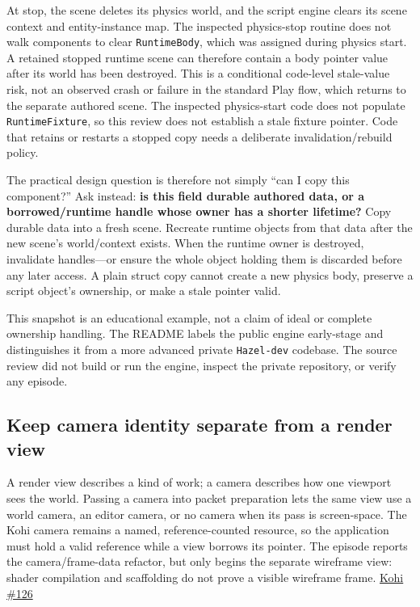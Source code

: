 At stop, the scene deletes its physics world, and the script engine clears its scene context and entity-instance map. The inspected physics-stop routine does not walk components to clear \texttt{RuntimeBody}, which was assigned during physics start. A retained stopped runtime scene can therefore contain a body pointer value after its world has been destroyed. This is a conditional code-level stale-value risk, not an observed crash or failure in the standard Play flow, which returns to the separate authored scene. The inspected physics-start code does not populate \texttt{RuntimeFixture}, so this review does not establish a stale fixture pointer. Code that retains or restarts a stopped copy needs a deliberate invalidation/rebuild policy.

The practical design question is therefore not simply ``can I copy this component?'' Ask instead: \textbf{is this field durable authored data, or a borrowed/runtime handle whose owner has a shorter lifetime?} Copy durable data into a fresh scene. Recreate runtime objects from that data after the new scene's world/context exists. When the runtime owner is destroyed, invalidate handles---or ensure the whole object holding them is discarded before any later access. A plain struct copy cannot create a new physics body, preserve a script object's ownership, or make a stale pointer valid.

This snapshot is an educational example, not a claim of ideal or complete ownership handling. The README labels the public engine early-stage and distinguishes it from a more advanced private \texttt{Hazel-dev} codebase. The source review did not build or run the engine, inspect the private repository, or verify any episode.

\subsection{Keep camera identity separate from a render view}\label{06-engine-ii-ch032-keep-camera-identity-separate-from-a-render-view}

A render view describes a kind of work; a camera describes how one viewport sees the world. Passing a camera into packet preparation lets the same view use a world camera, an editor camera, or no camera when its pass is screen-space. The Kohi camera remains a named, reference-counted resource, so the application must hold a valid reference while a view borrows its pointer. The episode reports the camera/frame-data refactor, but only begins the separate wireframe view: shader compilation and scaffolding do not prove a visible wireframe frame. \href{https://www.youtube.com/watch?v=xCA1MY94Hh0}{Kohi \#126}

